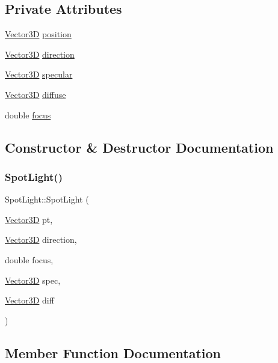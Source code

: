 \subsection*{Private Attributes}
\begin{DoxyCompactItemize}
\item 
\mbox{\hyperlink{classVector3D}{Vector3D}} \mbox{\hyperlink{classSpotLight_aca124556510f5fd4d44660174f077cd7}{position}}
\item 
\mbox{\hyperlink{classVector3D}{Vector3D}} \mbox{\hyperlink{classSpotLight_a536a59851dfaafa45f15c120295a1d24}{direction}}
\item 
\mbox{\hyperlink{classVector3D}{Vector3D}} \mbox{\hyperlink{classSpotLight_a21623e0e4a294ddb7068ee618dfab1d6}{specular}}
\item 
\mbox{\hyperlink{classVector3D}{Vector3D}} \mbox{\hyperlink{classSpotLight_aad9742cfa7d1c049ad051bc87a996e04}{diffuse}}
\item 
double \mbox{\hyperlink{classSpotLight_a0fe5ae38bd4778e16fc2c1587c554a69}{focus}}
\end{DoxyCompactItemize}


\subsection{Constructor \& Destructor Documentation}
\mbox{\label{classSpotLight_a2c1e4da1b0f152f7a46e9a1eff42a008}} 
\subsubsection{\texorpdfstring{SpotLight()}{SpotLight()}}
{\footnotesize\ttfamily Spot\+Light\+::\+Spot\+Light (\begin{DoxyParamCaption}\item[{\mbox{\hyperlink{classVector3D}{Vector3D}}}]{pt,  }\item[{\mbox{\hyperlink{classVector3D}{Vector3D}}}]{direction,  }\item[{double}]{focus,  }\item[{\mbox{\hyperlink{classVector3D}{Vector3D}}}]{spec,  }\item[{\mbox{\hyperlink{classVector3D}{Vector3D}}}]{diff }\end{DoxyParamCaption})}



\subsection{Member Function Documentation}
\mbox{\label{classSpotLight_a0810e4bd136caddea0c65b819f2bd400}} 

